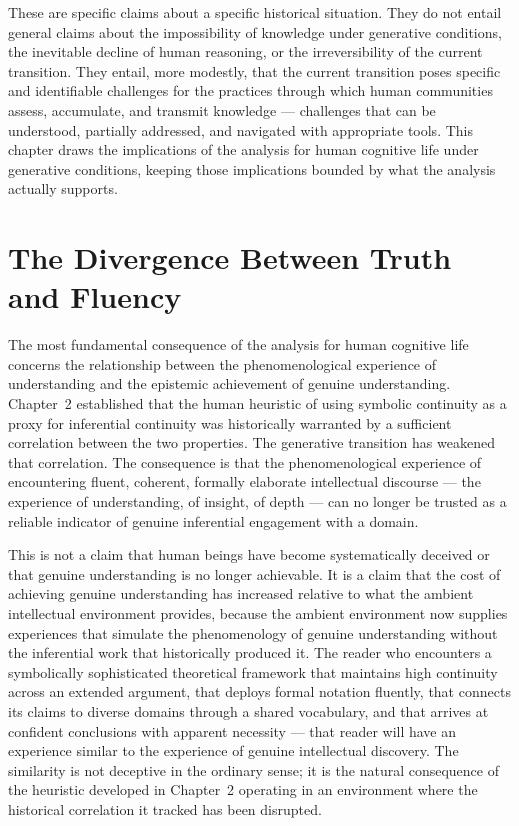 \documentclass[12pt, openright, twoside]{book}
\begin{document}
These are specific claims about a specific historical situation. They
do not entail general claims about the impossibility of knowledge under
generative conditions, the inevitable decline of human reasoning, or the
irreversibility of the current transition. They entail, more modestly,
that the current transition poses specific and identifiable challenges
for the practices through which human communities assess, accumulate, and
transmit knowledge --- challenges that can be understood, partially
addressed, and navigated with appropriate tools. This chapter draws the
implications of the analysis for human cognitive life under generative
conditions, keeping those implications bounded by what the analysis
actually supports.

\section{The Divergence Between Truth and Fluency}

The most fundamental consequence of the analysis for human cognitive life
concerns the relationship between the phenomenological experience of
understanding and the epistemic achievement of genuine understanding.
Chapter~2 established that the human heuristic of using symbolic continuity
as a proxy for inferential continuity was historically warranted by a
sufficient correlation between the two properties. The generative transition
has weakened that correlation. The consequence is that the phenomenological
experience of encountering fluent, coherent, formally elaborate intellectual
discourse --- the experience of understanding, of insight, of depth ---
can no longer be trusted as a reliable indicator of genuine inferential
engagement with a domain.

This is not a claim that human beings have become systematically deceived
or that genuine understanding is no longer achievable. It is a claim that
the cost of achieving genuine understanding has increased relative to
what the ambient intellectual environment provides, because the ambient
environment now supplies experiences that simulate the phenomenology of
genuine understanding without the inferential work that historically
produced it. The reader who encounters a symbolically sophisticated
theoretical framework that maintains high continuity across an extended
argument, that deploys formal notation fluently, that connects its claims
to diverse domains through a shared vocabulary, and that arrives at
confident conclusions with apparent necessity --- that reader will have
an experience similar to the experience of genuine intellectual discovery.
The similarity is not deceptive in the ordinary sense; it is the natural
consequence of the heuristic developed in Chapter~2 operating in an
environment where the historical correlation it tracked has been disrupted.
\end{document}
